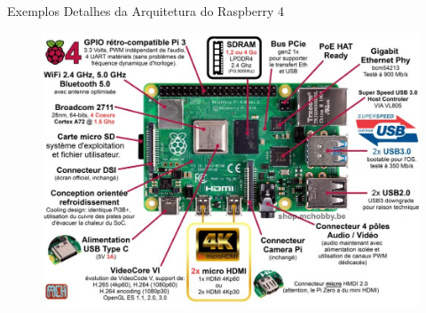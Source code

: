\documentclass[t]{beamer}
\begin{document}
\begin{frame}{Exemplos}
	Detalhes da Arquitetura do Raspberry 4
	\begin{figure}
		\includegraphics[width=0.8\linewidth]{raspberry-pi-4}
	\end{figure}
\end{frame}

\frame{\titlepage}
\end{document}
